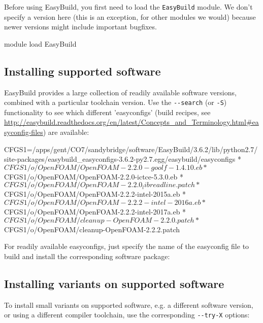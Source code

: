 Before using EasyBuild, you first need to load the \lstinline|EasyBuild| module. We don't specify
a version here (this is an exception, for other modules we would) because newer versions
might include important bugfixes.

\begin{prompt}
module load EasyBuild
\end{prompt}

\subsection{Installing supported software}

EasyBuild provides a large collection of readily available software versions,
combined with a particular toolchain version. Use the \lstinline|--search|
(or \lstinline|-S|) functionality to see which different 'easyconfigs'
(build recipes, see \url{http://easybuild.readthedocs.org/en/latest/Concepts_and_Terminology.html#easyconfig-files}) are available:

\begin{prompt}
CFGS1=/apps/gent/CO7/sandybridge/software/EasyBuild/3.6.2/lib/python2.7/site-packages/easybuild_easyconfigs-3.6.2-py2.7.egg/easybuild/easyconfigs
 * $CFGS1/o/OpenFOAM/OpenFOAM-2.2.0-goolf-1.4.10.eb
 * $CFGS1/o/OpenFOAM/OpenFOAM-2.2.0-ictce-5.3.0.eb
 * $CFGS1/o/OpenFOAM/OpenFOAM-2.2.0_libreadline.patch
 * $CFGS1/o/OpenFOAM/OpenFOAM-2.2.2-intel-2015a.eb
 * $CFGS1/o/OpenFOAM/OpenFOAM-2.2.2-intel-2016a.eb
 * $CFGS1/o/OpenFOAM/OpenFOAM-2.2.2-intel-2017a.eb
 * $CFGS1/o/OpenFOAM/cleanup-OpenFOAM-2.2.0.patch
 * $CFGS1/o/OpenFOAM/cleanup-OpenFOAM-2.2.2.patch
\end{prompt}

For readily available easyconfigs, just specify the name of the easyconfig file to build
and install the corresponding software package:

\begin{prompt}
\end{prompt}

\subsection{Installing variants on supported software}

To install small variants on supported software, e.g. a different software version,
or using a different compiler toolchain, use the corresponding \lstinline|--try-X| options:

